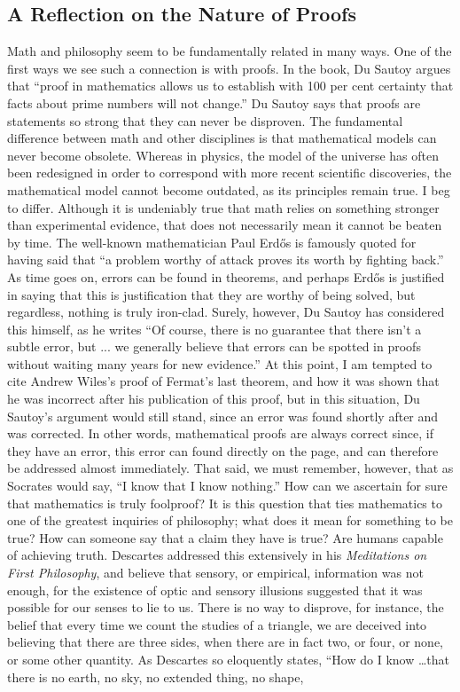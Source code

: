 \documentclass{mathbook}
\begin{document}
    \subsection{A Reflection on the Nature of Proofs}\label{proofs}

    Math and philosophy seem to be fundamentally related in many ways. One of the first ways we see such a connection is with proofs. In the book, Du Sautoy argues that ``proof in mathematics allows us to establish with 100 per cent certainty that facts about prime numbers will not change.'' \cite[pg.~32]{Sautoy2003} Du Sautoy says that proofs are statements so strong that they can never be disproven. The fundamental difference between math and other disciplines is that mathematical models can never become obsolete. Whereas in physics, the model of the universe has often been redesigned in order to correspond with more recent scientific discoveries, the mathematical model cannot become outdated, as its principles remain true. I beg to differ. Although it is undeniably true that math relies on something stronger than experimental evidence, that does not necessarily mean it cannot be beaten by time. The well-known mathematician Paul Erdős is famously quoted for having said that ``a problem worthy of attack proves its worth by fighting back.'' As time goes on, errors can be found in theorems, and perhaps Erdős is justified in saying that this is justification that they are worthy of being solved, but regardless, nothing is truly iron-clad. Surely, however, Du Sautoy has considered this himself, as he writes ``Of course, there is no guarantee that there isn't a subtle error, but ... we generally believe that errors can be spotted in proofs without waiting many years for new evidence.'' \cite[p.~33]{Sautoy2003} At this point, I am tempted to cite Andrew Wiles's proof of Fermat's last theorem, and how it was shown that he was incorrect after his publication of this proof, but in this situation, Du Sautoy's argument would still stand, since an error was found shortly after and was corrected. In other words, mathematical proofs are always correct since, if they have an error, this error can found directly on the page, and can therefore be addressed almost immediately. That said, we must remember, however, that as Socrates would say, ``I know that I know nothing.'' How can we ascertain for sure that mathematics is truly foolproof? It is this question that ties mathematics to one of the greatest inquiries of philosophy; what does it mean for something to be true? How can someone say that a claim they have is true? Are humans capable of achieving truth. Descartes addressed this extensively in his \emph{Meditations on First Philosophy}, \cite{Descartes1637} and believe that sensory, or empirical, information was not enough, for the existence of optic and sensory illusions suggested that it was possible for our senses to lie to us. There is no way to disprove, for instance, the belief that every time we count the studies of a triangle, we are deceived into believing that there are three sides, when there are in fact two, or four, or none, or some other quantity. \cite{Newman2019} As Descartes so eloquently states, ``How do I know \dots that there is no earth, no sky, no extended thing, no shape, 
\end{document}
